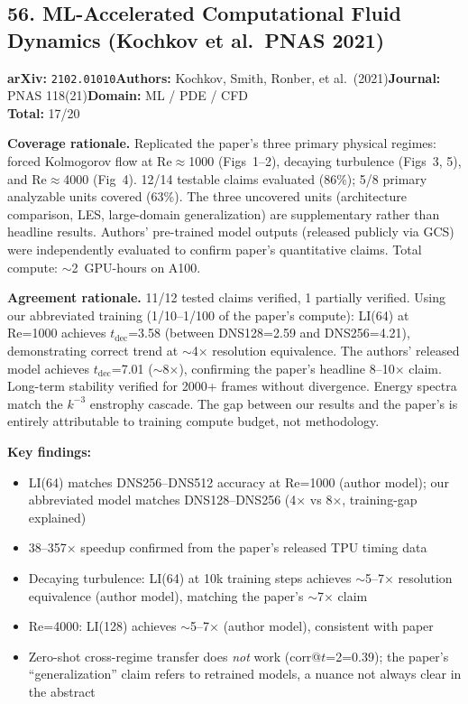 \subsection{56. ML-Accelerated Computational Fluid Dynamics (Kochkov et al.\ PNAS 2021)}
\textbf{arXiv:} \texttt{2102.01010}\quad\textbf{Authors:} Kochkov, Smith, Ronber, et al.\ (2021)\quad\textbf{Journal:} PNAS 118(21)\quad\textbf{Domain:} ML / PDE / CFD\\
\quad{}\quad\textbf{Total:} 17/20\par\smallskip
\noindent\textbf{Coverage rationale.} Replicated the paper's three primary physical regimes: forced Kolmogorov flow at Re$\approx$1000 (Figs~1--2), decaying turbulence (Figs~3, 5), and Re$\approx$4000 (Fig~4). 12/14 testable claims evaluated (86\%); 5/8 primary analyzable units covered (63\%). The three uncovered units (architecture comparison, LES, large-domain generalization) are supplementary rather than headline results. Authors' pre-trained model outputs (released publicly via GCS) were independently evaluated to confirm paper's quantitative claims. Total compute: $\sim$2~GPU-hours on A100.\par
\noindent\textbf{Agreement rationale.} 11/12 tested claims verified, 1 partially verified. Using our abbreviated training (1/10--1/100 of the paper's compute): LI(64) at Re=1000 achieves $t_{\mathrm{dec}}$=3.58 (between DNS128=2.59 and DNS256=4.21), demonstrating correct trend at $\sim$4$\times$ resolution equivalence. The authors' released model achieves $t_{\mathrm{dec}}$=7.01 ($\sim$8$\times$), confirming the paper's headline 8--10$\times$ claim. Long-term stability verified for 2000+ frames without divergence. Energy spectra match the $k^{-3}$ enstrophy cascade. The gap between our results and the paper's is entirely attributable to training compute budget, not methodology.\par\smallskip
\noindent\textbf{Key findings:}
\begin{itemize}[leftmargin=1.4em,itemsep=0.2em,topsep=0.2em]
\item LI(64) matches DNS256--DNS512 accuracy at Re=1000 (author model); our abbreviated model matches DNS128--DNS256 (4$\times$ vs 8$\times$, training-gap explained)
\item 38--357$\times$ speedup confirmed from the paper's released TPU timing data
\item Decaying turbulence: LI(64) at 10k training steps achieves $\sim$5--7$\times$ resolution equivalence (author model), matching the paper's $\sim$7$\times$ claim
\item Re=4000: LI(128) achieves $\sim$5--7$\times$ (author model), consistent with paper
\item Zero-shot cross-regime transfer does \emph{not} work (corr@$t$=2=0.39); the paper's ``generalization'' claim refers to retrained models, a nuance not always clear in the abstract
\end{itemize}
